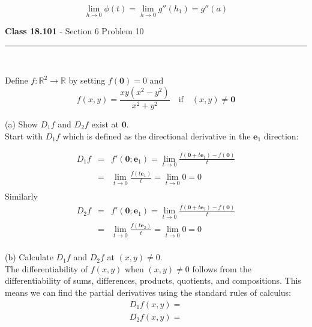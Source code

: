 \documentclass[11pt,reqno]{article}
\begin{document}
\[ \lim_{h \to 0} \phi(t) = \lim_{h \to 0} g''(h_1) = g''(a) \]

\begin{flushleft} 
\textbf{Class 18.101} - Section 6 Problem 10\\
\rule{500pt}{1pt}\\
\end{flushleft} 

\noindent Define $f : \mathbb{R}^2 \to \mathbb{R}$ by setting $f(\textbf{0}) = 0$ and 
\[ f(x,y) = \frac{xy(x^2 - y^2)}{x^2 + y^2} \quad \text{if} \quad \text{$(x,y) \neq \textbf{0}$} \]

\noindent (a) Show $D_1 f$ and $D_2 f$ exist at $\textbf{0}$.\\

\noindent Start with $D_1 f$ which is defined as the directional derivative in the $\textbf{e}_1$ direction:

\begin{eqnarray*}
D_1 f &=& f'(\textbf{0};\textbf{e}_1) = \lim_{t \to 0} \frac{f(\textbf{0} + t \textbf{e}_1) - f(\textbf{0})}{t}\\
&=& \lim_{t \to 0} \frac{f(t \textbf{e}_1)}{t} = \lim_{t \to 0} 0 = 0\\
\end{eqnarray*}
Similarly
\begin{eqnarray*}
D_2 f &=& f'(\textbf{0};\textbf{e}_1) = \lim_{t \to 0} \frac{f(\textbf{0} + t \textbf{e}_2) - f(\textbf{0})}{t}\\
&=& \lim_{t \to 0} \frac{f(t \textbf{e}_2)}{t} = \lim_{t \to 0} 0 = 0\\
\end{eqnarray*}

\noindent (b) Calculate $D_1 f$ and $D_2 f$ at $(x,y) \neq 0$. \\

The differentiability of $f(x,y)$ when $(x,y) \neq 0$ follows from the differentiability of sums, differences, products, quotients, and compositions. This means we can find the partial derivatives using the standard rules of calculus:
\begin{eqnarray*}
D_1 f (x,y) = \\
D_2 f (x,y) = \\
\end{eqnarray*}
\end{document}
